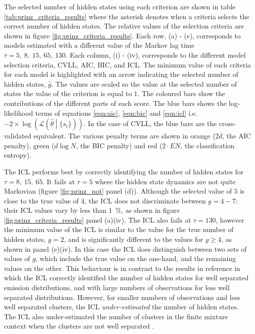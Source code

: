 The selected number of hidden states using each criterion are shown in table \ref{tab:prinz_criteria_results} where the asterisk denotes when a criteria selects the correct number of hidden states. The relative values of the selection criteria are shown in figure \ref{fig:prinz_criteria_results}. Each row, (a) - (e), corresponds to models estimated with a  different value of the Markov lag time $\tau=5,\ 8,\ 15,\ 65,\ 130$. Each column, (i) - (iv), corresponds to the different model selection criteria, CVLL, AIC, BIC, and ICL. The minimum value of each criteria for each model is highlighted with an arrow indicating the selected number of hidden states, $\hat{g}$. The values are scaled so the value at the selected number of states the value of the criterion is equal to $1$.  The coloured bars show the contributions of the different parts of each score. The blue bars shows the log-likelihood terms of equations \ref{eqn:aic}, \ref{eqn:bic} and \ref{eqn:icl} i.e.  $-2\times \log{\left(\mathcal{L}\left(\hat{\theta}\middle |\{s_t\}\right)\right)}$. In the case of CVLL, the blue bars are the  cross-validated equivalent. The various penalty terms are shown in orange ($2d$, the AIC penalty), green ($d\log{N}$, the BIC penalty) and red ($2\cdot EN$, the classification entropy). 

The ICL performs best by correctly identifying the number of hidden states for $\tau=8,\ 15,\ 65$. It fails at $\tau=5$ where the hidden state dynamics are not quite Markovian (figure \ref{fig:prinz_pot} panel (d)). Although the selected value of $5$ is close to the true value of $4$, the ICL does not discriminate between $g=4 - 7$: their ICL values vary by less than \SI{1}{\percent}, as shown in figure \ref{fig:prinz_criteria_results} panel (a)(iv). The ICL also fails at $\tau=130$, however the minimum value of the ICL is similar to the value for the true number of hidden states, $g = 2$, and is significantly different to the values for $g \ge 4$,  as shown in panel (e)(iv). In this case the ICL does distinguish between two sets of values of $g$, which include the true value on the one-hand, and the remaining values on the other. This behaviour is in contrast to the results in reference \cite{celeuxSelectingHiddenMarkov2008} in which the ICL correctly identified the number of hidden states for well separated emission distributions, and with large numbers of observations for less well separated distributions. However, for smaller numbers of observations and less well separated clusters, the ICL \emph{under-estimated} the number of hidden states. The ICL also under-estimated the number of clusters in the finite mixture context when the clusters are not well separated \cite{biernackiAssessingMixtureModel2000a}. 

